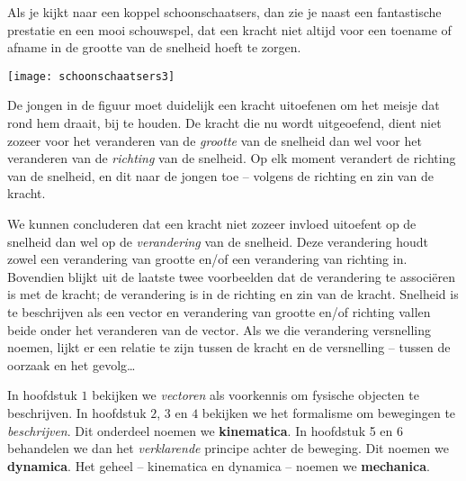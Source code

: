 \documentclass{ximera}
\begin{document}
Als je kijkt naar een koppel schoonschaatsers, dan zie je naast een fantastische prestatie en een mooi schouwspel, dat een kracht niet altijd voor een toename of afname in de grootte van de snelheid hoeft te zorgen. 

\begin{image}
\texttt{[image: schoonschaatsers3]}
\end{image}

De jongen in de figuur moet duidelijk een kracht uitoefenen om het meisje dat rond hem draait, bij te houden. 
De kracht die nu wordt uitgeoefend, dient niet zozeer voor het veranderen van de \textit{grootte} van de snelheid dan wel voor het veranderen van de \textit{richting} van de snelheid. 
Op elk moment verandert de richting van de snelheid, en dit naar de jongen toe -- volgens de richting en zin van de kracht.

We kunnen concluderen dat een kracht niet zozeer invloed uitoefent op de snelheid dan wel op de \textit{verandering} van de snelheid. 
Deze verandering houdt zowel een verandering van grootte en/of een verandering van richting in. 
Bovendien blijkt uit de laatste twee voorbeelden dat de verandering te associëren is met de kracht; de verandering is in de richting en zin van de kracht. 
Snelheid is te beschrijven als een vector en verandering van grootte en/of richting vallen beide onder het veranderen van de vector. 
Als we die verandering versnelling noemen, lijkt er een relatie te zijn tussen de kracht en de versnelling -- tussen de oorzaak en het gevolg\ldots

In hoofdstuk \(1\) bekijken we \textit{vectoren} als voorkennis om fysische objecten te beschrijven. 
In hoofdstuk \(2\), \(3\) en \(4\) bekijken we het formalisme om bewegingen te \textit{beschrijven}. 
Dit onderdeel noemen we \textbf{kinematica}. 
In hoofdstuk 5 en 6 behandelen we dan het \textit{verklarende} principe achter de beweging. 
Dit noemen we \textbf{dynamica}. 
Het geheel -- kinematica en dynamica -- noemen we \textbf{mechanica}.
\end{document}
